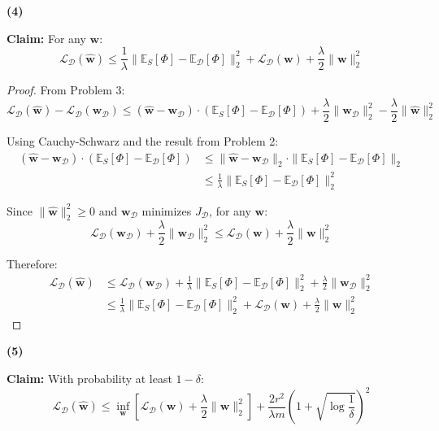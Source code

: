 \documentclass[letterpaper, 11pt]{article}
\newcommand{\1}{\mathds{1}}	%
\theoremstyle{definition}
\begin{document}
\textbf{(4)}

\textbf{Claim:} For any $\mathbf{w}$:
$$\mathcal{L}_\mathcal{D}(\widehat{\mathbf{w}}) \leq \frac{1}{\lambda}\|\mathbb{E}_S[\Phi] - \mathbb{E}_\mathcal{D}[\Phi]\|_2^2 + \mathcal{L}_\mathcal{D}(\mathbf{w}) + \frac{\lambda}{2}\|\mathbf{w}\|_2^2$$

\begin{proof}
From Problem 3:
$$\mathcal{L}_\mathcal{D}(\widehat{\mathbf{w}}) - \mathcal{L}_\mathcal{D}(\mathbf{w}_\mathcal{D}) \leq (\widehat{\mathbf{w}} - \mathbf{w}_\mathcal{D}) \cdot (\mathbb{E}_S[\Phi] - \mathbb{E}_\mathcal{D}[\Phi]) + \frac{\lambda}{2}\|\mathbf{w}_\mathcal{D}\|_2^2 - \frac{\lambda}{2}\|\widehat{\mathbf{w}}\|_2^2$$

Using Cauchy-Schwarz and the result from Problem 2:
\begin{align*}
(\widehat{\mathbf{w}} - \mathbf{w}_\mathcal{D}) \cdot (\mathbb{E}_S[\Phi] - \mathbb{E}_\mathcal{D}[\Phi]) &\leq \|\widehat{\mathbf{w}} - \mathbf{w}_\mathcal{D}\|_2 \cdot \|\mathbb{E}_S[\Phi] - \mathbb{E}_\mathcal{D}[\Phi]\|_2 \\
&\leq \frac{1}{\lambda}\|\mathbb{E}_S[\Phi] - \mathbb{E}_\mathcal{D}[\Phi]\|_2^2
\end{align*}

Since $\|\widehat{\mathbf{w}}\|_2^2 \geq 0$ and $\mathbf{w}_\mathcal{D}$ minimizes $J_\mathcal{D}$, for any $\mathbf{w}$:
$$\mathcal{L}_\mathcal{D}(\mathbf{w}_\mathcal{D}) + \frac{\lambda}{2}\|\mathbf{w}_\mathcal{D}\|_2^2 \leq \mathcal{L}_\mathcal{D}(\mathbf{w}) + \frac{\lambda}{2}\|\mathbf{w}\|_2^2$$

Therefore:
\begin{align*}
\mathcal{L}_\mathcal{D}(\widehat{\mathbf{w}}) &\leq \mathcal{L}_\mathcal{D}(\mathbf{w}_\mathcal{D}) + \frac{1}{\lambda}\|\mathbb{E}_S[\Phi] - \mathbb{E}_\mathcal{D}[\Phi]\|_2^2 + \frac{\lambda}{2}\|\mathbf{w}_\mathcal{D}\|_2^2 \\
&\leq \frac{1}{\lambda}\|\mathbb{E}_S[\Phi] - \mathbb{E}_\mathcal{D}[\Phi]\|_2^2 + \mathcal{L}_\mathcal{D}(\mathbf{w}) + \frac{\lambda}{2}\|\mathbf{w}\|_2^2
\end{align*}
\end{proof}

\textbf{(5)}

\textbf{Claim:} With probability at least $1-\delta$:
$$\mathcal{L}_\mathcal{D}(\widehat{\mathbf{w}}) \leq \inf_{\mathbf{w}} \left[\mathcal{L}_\mathcal{D}(\mathbf{w}) + \frac{\lambda}{2}\|\mathbf{w}\|_2^2\right] + \frac{2r^2}{\lambda m}\left(1 + \sqrt{\log\frac{1}{\delta}}\right)^2$$
\end{document}
